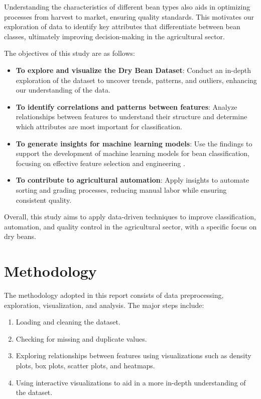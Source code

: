 \documentclass[a4paper,12pt]{article}
\begin{document}
Understanding the characteristics of different bean types also aids in optimizing processes from harvest to market, ensuring quality standards. This motivates our exploration of data to identify key attributes that differentiate between bean classes, ultimately improving decision-making in the agricultural sector.

The objectives of this study are as follows:
\begin{itemize}
    \item \textbf{To explore and visualize the Dry Bean Dataset}: Conduct an in-depth exploration of the dataset to uncover trends, patterns, and outliers, enhancing our understanding of the data.
    
    \item \textbf{To identify correlations and patterns between features}: Analyze relationships between features to understand their structure and determine which attributes are most important for classification.
    
    \item \textbf{To generate insights for machine learning models}: Use the findings to support the development of machine learning models for bean classification, focusing on effective feature selection and engineering \cite{gautam2022feature}.
    
    \item \textbf{To contribute to agricultural automation}: Apply insights to automate sorting and grading processes, reducing manual labor while ensuring consistent quality.
\end{itemize}

Overall, this study aims to apply data-driven techniques to improve classification, automation, and quality control in the agricultural sector, with a specific focus on dry beans.

\section{Methodology}
The methodology adopted in this report consists of data preprocessing, exploration, visualization, and analysis. The major steps include:
\begin{enumerate}
    \item Loading and cleaning the dataset.
    \item Checking for missing and duplicate values.
    \item Exploring relationships between features using visualizations such as density plots, box plots, scatter plots, and heatmaps.
    \item Using interactive visualizations to aid in a more in-depth understanding of the dataset.
\end{enumerate}
\end{document}

